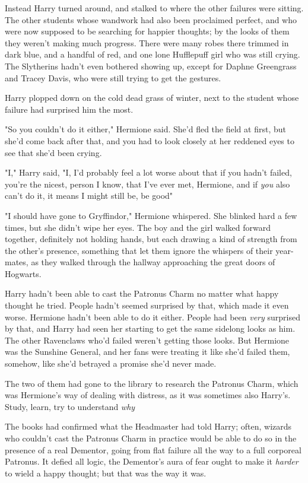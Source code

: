 Instead Harry turned around, and stalked to where the other failures were
sitting. The other students whose wandwork had also been proclaimed perfect,
and who were now supposed to be searching for happier thoughts; by the looks of
them they weren't making much progress. There were many robes there trimmed in
dark blue, and a handful of red, and one lone Hufflepuff girl who was still
crying. The Slytherins hadn't even bothered showing up, except for Daphne
Greengrass and Tracey Davis, who were still trying to get the gestures.

Harry plopped down on the cold dead grass of winter, next to the student whose
failure had surprised him the most.

"So you couldn't do it either," Hermione said. She'd fled the field at first,
but she'd come back after that, and you had to look closely at her reddened
eyes to see that she'd been crying.

"I," Harry said, "I, I'd probably feel a lot worse about that if you hadn't
failed, you're the nicest, person I know, that I've ever met, Hermione, and if
\emph{you} also can't do it, it means I might still be, be good{\el}"

"I should have gone to Gryffindor," Hermione whispered. She blinked hard a few
times, but she didn't wipe her eyes.
\sbreak
The boy and the girl walked forward together, definitely not holding hands, but
each drawing a kind of strength from the other's presence, something that let
them ignore the whispers of their year-mates, as they walked through the
hallway approaching the great doors of Hogwarts.

Harry hadn't been able to cast the Patronus Charm no matter what happy thought
he tried. People hadn't seemed surprised by that, which made it even worse.
Hermione hadn't been able to do it either. People had been \emph{very}
surprised by that, and Harry had seen her starting to get the same sidelong
looks as him. The other Ravenclaws who'd failed weren't getting those looks.
But Hermione was the Sunshine General, and her fans were treating it like she'd
failed them, somehow, like she'd betrayed a promise she'd never made.

The two of them had gone to the library to research the Patronus Charm, which
was Hermione's way of dealing with distress, as it was sometimes also Harry's.
Study, learn, try to understand \emph{why{\el}}

The books had confirmed what the Headmaster had told Harry; often, wizards who
couldn't cast the Patronus Charm in practice would be able to do so in the
presence of a real Dementor, going from flat failure all the way to a full
corporeal Patronus. It defied all logic, the Dementor's aura of fear ought to
make it \emph{harder} to wield a happy thought; but that was the way it was.

